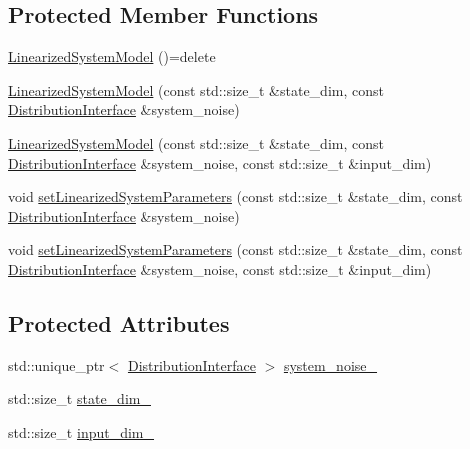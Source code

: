 \subsection*{Protected Member Functions}
\begin{DoxyCompactItemize}
\item 
\hyperlink{classrefill_1_1LinearizedSystemModel_aa0c5e6dea98f7d287b8b2928a42d91fe}{Linearized\+System\+Model} ()=delete
\item 
\hyperlink{classrefill_1_1LinearizedSystemModel_a0181615604602290af776b97ed5a9200}{Linearized\+System\+Model} (const std\+::size\+\_\+t \&state\+\_\+dim, const \hyperlink{classrefill_1_1DistributionInterface}{Distribution\+Interface} \&system\+\_\+noise)
\item 
\hyperlink{classrefill_1_1LinearizedSystemModel_ae8b8577bdbd47e09e076580627415358}{Linearized\+System\+Model} (const std\+::size\+\_\+t \&state\+\_\+dim, const \hyperlink{classrefill_1_1DistributionInterface}{Distribution\+Interface} \&system\+\_\+noise, const std\+::size\+\_\+t \&input\+\_\+dim)
\item 
void \hyperlink{classrefill_1_1LinearizedSystemModel_aa48b63f9e77005ad06dc5a0c139981a1}{set\+Linearized\+System\+Parameters} (const std\+::size\+\_\+t \&state\+\_\+dim, const \hyperlink{classrefill_1_1DistributionInterface}{Distribution\+Interface} \&system\+\_\+noise)
\item 
void \hyperlink{classrefill_1_1LinearizedSystemModel_a5e98bd8b62b34131cd899a95b33b0209}{set\+Linearized\+System\+Parameters} (const std\+::size\+\_\+t \&state\+\_\+dim, const \hyperlink{classrefill_1_1DistributionInterface}{Distribution\+Interface} \&system\+\_\+noise, const std\+::size\+\_\+t \&input\+\_\+dim)
\end{DoxyCompactItemize}
\subsection*{Protected Attributes}
\begin{DoxyCompactItemize}
\item 
std\+::unique\+\_\+ptr$<$ \hyperlink{classrefill_1_1DistributionInterface}{Distribution\+Interface} $>$ \hyperlink{classrefill_1_1LinearizedSystemModel_abcb01be2aebea780081bd4ab23054688}{system\+\_\+noise\+\_\+}
\item 
std\+::size\+\_\+t \hyperlink{classrefill_1_1LinearizedSystemModel_adab5ae7b63bd600d3598a606f6d30f63}{state\+\_\+dim\+\_\+}
\item 
std\+::size\+\_\+t \hyperlink{classrefill_1_1LinearizedSystemModel_a9a868348ddf53dc52eda838093c6a3b8}{input\+\_\+dim\+\_\+}
\end{DoxyCompactItemize}


